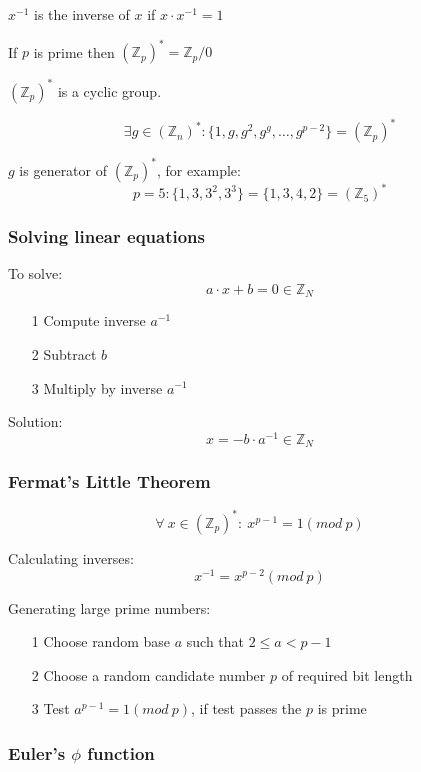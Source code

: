 \documentclass[a4paper]{article}
\begin{document}
$x^{-1}$ is the inverse of $x$ if $x \cdot x^{-1} = 1$

If $p$ is prime then $(\mathbb{Z}_{p})^{*} = \mathbb{Z}_{p} / {0}$

$(\mathbb{Z}_{p})^{*}$ is a cyclic group.

\[
  \exists g \in (\mathbb{Z}_{n})^{*} :
  \{1, g, g^{2}, g^{g}, \ldots, g^{p-2}\} = (\mathbb{Z}_{p})^{*}
\]

$g$ is  generator of $(\mathbb{Z}_{p})^{*}$, for example:
\[p = 5: \{1, 3, 3^{2}, 3^{3}\} = \{1, 3, 4, 2\} = (\mathbb{Z}_{5})^{*}\]

\subsubsection{Solving linear equations}

To solve:
\[a \cdot x + b = 0 \in \mathbb{Z}_{N}\]

\begin{enumerate}
  \item[1] Compute inverse $a^{-1}$
  \item[2] Subtract $b$
  \item[3] Multiply by inverse $a^{-1}$
\end{enumerate}

Solution:
\[x = -b \cdot a^{-1} \in \mathbb{Z}_{N}\]

\subsubsection{Fermat's Little Theorem}

\[
  \forall \: x \in (\mathbb{Z}_{p})^{*}: \: x^{p-1} = 1 (mod \: p)
\]

Calculating inverses:
\[
  x^{-1} = x^{p-2} (mod \: p)
\]

Generating large prime numbers:
\begin{enumerate}
  \item[1] Choose random base $a$ such that $2 \leq a < p - 1$
  \item[2] Choose a random candidate number $p$ of required bit length
  \item[3] Test $a^{p-1} = 1 (mod \: p)$, if test passes the $p$ is prime
\end{enumerate}

\subsubsection{Euler's $\phi$ function}
\end{document}
